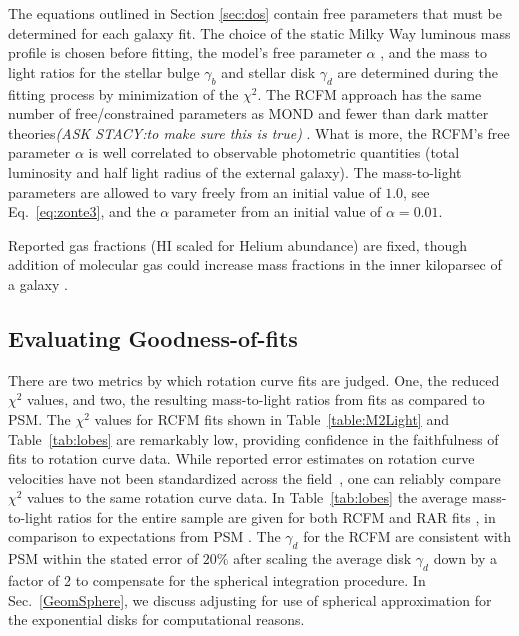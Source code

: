 \documentclass[reprint,%
 amsmath,amssymb,
 aps,
]{revtex4-1}
\begin{document}
The equations outlined in Section \ref{sec:dos} contain   free parameters that must be determined for each galaxy fit. The choice of the static Milky Way luminous mass profile is chosen before fitting,  the model's free parameter $\alpha$ ,  and the mass to light ratios for the  stellar bulge $\gamma_b$ and stellar disk $\gamma_d$ are determined during the fitting process by minimization of the $\chi^2$. 
The RCFM approach  has  the same number of free/constrained parameters as MOND and fewer than dark matter theories{\color{blue}\emph{(ASK STACY:to make sure this is true)} }.   What is more, the RCFM's free parameter $\alpha$ is well correlated to  observable photometric quantities (total luminosity and half light radius of the external galaxy).  
The mass-to-light parameters   are allowed to vary freely from an initial value of $1.0$, see Eq.~\ref{eq:zonte3}, and the $\alpha$ parameter     from an initial value of $\alpha = 0.01$. 

Reported gas fractions (HI scaled for Helium abundance) are fixed,  though addition of molecular gas could increase mass fractions in the inner kiloparsec of a galaxy   \cite{2004ApJ...609..652M}.





\subsection{Evaluating Goodness-of-fits}

There are two metrics by which rotation curve fits are judged. One, the reduced  $\chi^2$ values, and 
 two, the resulting mass-to-light ratios from   fits as compared to   PSM. 
The $\chi^{2}$ values for RCFM fits shown in Table~\ref{table:M2Light} and Table~\ref{tab:lobes} are remarkably low, providing confidence in the faithfulness of fits to rotation curve data.  
  While reported error    estimates on rotation curve velocities  have not been standardized across the field~\citep{Blok,Gent},     one can reliably   compare $\chi^{2}$ values  to the same rotation curve data. 
 In Table~\ref{tab:lobes}  the    average mass-to-light ratios for the entire sample are given for both RCFM and RAR fits ,  in comparison to expectations from PSM \citet{McGaugh2016RAR}.    {\color{teal} The $\gamma_d$ for the RCFM   are consistent with PSM within the stated error of $ 20\%$ \cite{2016Lelli} after scaling the average disk $\gamma_d$ down by a factor of 2 to compensate for the spherical integration procedure.   In Sec.~\ref{GeomSphere}, we discuss adjusting for use of  spherical approximation for the exponential disks for computational reasons.  }
  
\end{document}
